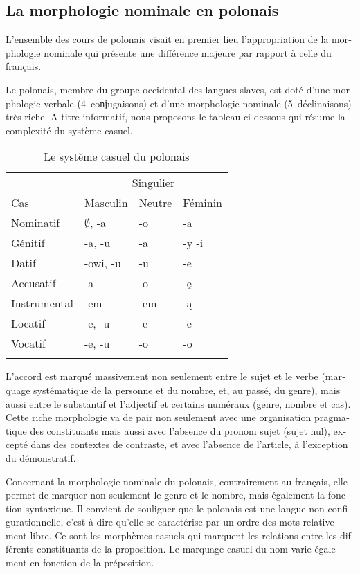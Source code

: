\documentclass[output=paper]{langscibook}
\begin{document}
\begin{otherlanguage}{french}
\subsection{La morphologie nominale en polonais}\label{sec:watorek:4.2}

L’ensemble des cours de polonais visait en premier lieu l’appropriation de la morphologie nominale qui présente une différence majeure par rapport à celle du français.

Le polonais, membre du groupe occidental des langues slaves, est doté d’une morphologie verbale (4~coǌugaisons) et d’une morphologie nominale (5~déclinaisons) très riche. A titre informatif, nous proposons le tableau ci-dessous qui résume la complexité du système casuel. 


\begin{table}
\caption{\label{tab:watorek:3} Le système casuel du polonais}
\begin{tabular}{l lll}
\lsptoprule
    & \multicolumn{3}{c}{Singulier}\\\cmidrule(lr){2-4}
Cas & Masculin & Neutre & Féminin\\\midrule
Nominatif & ${\emptyset}$, -a & -o & -a\\
Génitif & -a, -u & -a & -y -i\\
Datif & -owi, -u & -u & -e\\
Accusatif & -a & -o & -ę\\
Instrumental & -em & -em & -ą\\
Locatif & -e, -u & -e & -e\\
Vocatif & -e, -u & -o & -o\\
\lspbottomrule
\end{tabular}
\end{table}

L’accord est marqué massivement non seulement entre le sujet et le verbe (marquage systématique de la personne et du nombre, et, au passé, du genre), mais aussi entre le substantif et l’adjectif et certains numéraux (genre, nombre et cas). Cette riche morphologie va de pair non seulement avec une organisation pragmatique des constituants mais aussi avec l’absence du pronom sujet (sujet nul), excepté dans des contextes de contraste, et avec l’absence de l’article, à l’exception du démonstratif. 

Concernant la morphologie nominale du polonais, contrairement au français, elle permet de marquer non seulement le genre et le nombre, mais également la fonction syntaxique. Il convient de souligner que le polonais est une langue non configurationnelle, c’est-à-dire qu’elle se caractérise par un ordre des mots relativement libre. Ce sont les morphèmes casuels qui marquent les relations entre les différents constituants de la proposition. Le marquage casuel du nom varie également en fonction de la préposition. 


\end{otherlanguage}
\end{document}
